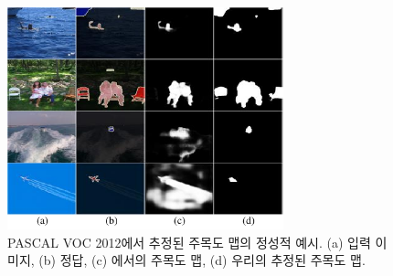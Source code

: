 \begin{figure}[t]
\centering
\includegraphics[width=8cm]{figures/fig_saliency_v2.pdf}
\caption{PASCAL VOC 2012에서 추정된 주목도 맵의 정성적 예시. (a) 입력 이미지, (b) 정답, (c) \cite{zhao2019pyramid}에서의 주목도 맵, (d) 우리의 추정된 주목도 맵.} \vspace{-2mm}
\label{fig:sal}
\end{figure}
